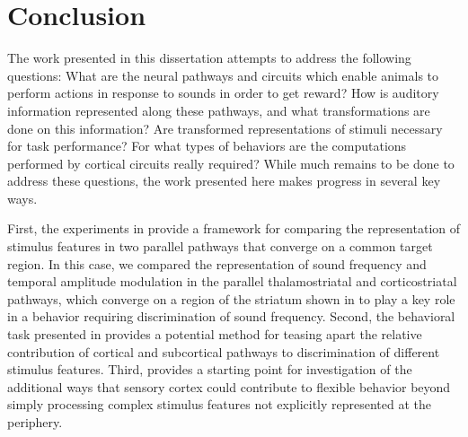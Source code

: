 \chapter{Conclusion}


The work presented in this dissertation attempts to address the following questions: 
%
What are the neural pathways and circuits which enable animals to perform actions in response to sounds in order to get reward? 
%
How is auditory information represented along these pathways, and what transformations are done on this information?
%
Are transformed representations of stimuli necessary for task performance?
%
For what types of behaviors are the computations performed by cortical circuits really required?
%
While much remains to be done to address these questions, the work presented here makes progress in several key ways. 
%

First, the experiments in \ch{\Thstr} provide a framework for comparing the representation of stimulus features in two parallel pathways that converge on a common target region. 
%
In this case, we compared the representation of sound frequency and temporal amplitude modulation in the parallel thalamostriatal and corticostriatal pathways, which converge on a region of the striatum shown in \ch{\Musc} to play a key role in a behavior requiring discrimination of sound frequency. 
%
Second, the behavioral task presented in \ch{\Amod} provides a potential method for teasing apart the relative contribution of cortical and subcortical pathways to discrimination of different stimulus features. 
%
Third, \ch{\Rev} provides a starting point for investigation of the additional ways that sensory cortex could contribute to flexible behavior beyond simply processing complex stimulus features not explicitly represented at the periphery.


